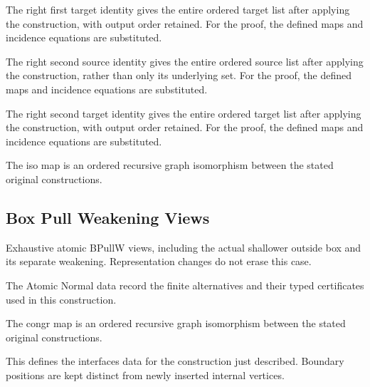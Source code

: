 The right first target identity gives the entire ordered target list after applying the construction, with output order retained.
For the proof, the defined maps and incidence equations are substituted.
\par{}

The right second source identity gives the entire ordered source list after applying the construction, rather than only its underlying set.
For the proof, the defined maps and incidence equations are substituted.
\par{}

The right second target identity gives the entire ordered target list after applying the construction, with output order retained.
For the proof, the defined maps and incidence equations are substituted.
\par{}

The iso map is an ordered recursive graph isomorphism between the stated original constructions.
\par{}

\subsection{Box Pull Weakening Views}
Exhaustive atomic BPullW views, including the actual shallower outside box and its separate weakening. Representation changes do not erase this case.

The Atomic Normal data record the finite alternatives and their typed certificates used in this construction.
\par{}

The congr map is an ordered recursive graph isomorphism between the stated original constructions.
\par{}

This defines the interfaces data for the construction just described. Boundary positions are kept distinct from newly inserted internal vertices.
\par{}

